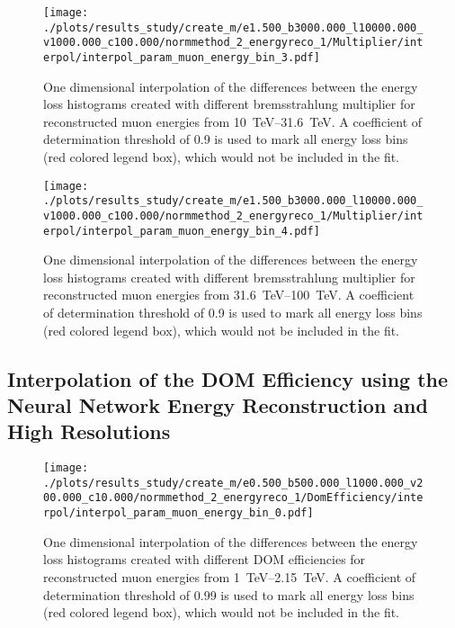 \begin{figure}[H]
    \centering
    \texttt{[image: ./plots/results\_study/create\_m/e1.500\_b3000.000\_l10000.000\_v1000.000\_c100.000/normmethod\_2\_energyreco\_1/Multiplier/interpol/interpol\_param\_muon\_energy\_bin\_3.pdf]}
    \caption{One dimensional interpolation of the differences between the energy loss histograms created with different bremsstrahlung multiplier for reconstructed muon energies from \SIrange{10}{31.6}{TeV}. A coefficient of determination threshold of \num{0.9} is used to mark all energy loss bins (red colored legend box), which would not be included in the fit.}
    \label{fig:study_1d_interpol_mu3_nn_low}
\end{figure}

\begin{figure}[H]
    \centering
    \texttt{[image: ./plots/results\_study/create\_m/e1.500\_b3000.000\_l10000.000\_v1000.000\_c100.000/normmethod\_2\_energyreco\_1/Multiplier/interpol/interpol\_param\_muon\_energy\_bin\_4.pdf]}
    \caption{One dimensional interpolation of the differences between the energy loss histograms created with different bremsstrahlung multiplier for reconstructed muon energies from \SIrange{31.6}{100}{TeV}. A coefficient of determination threshold of \num{0.9} is used to mark all energy loss bins (red colored legend box), which would not be included in the fit.}
    \label{fig:study_1d_interpol_mu4_nn_low}
\end{figure}

%

\subsection*{Interpolation of the DOM Efficiency using the Neural Network Energy Reconstruction and High Resolutions}

\begin{figure}[H]
    \centering
    \texttt{[image: ./plots/results\_study/create\_m/e0.500\_b500.000\_l1000.000\_v200.000\_c10.000/normmethod\_2\_energyreco\_1/DomEfficiency/interpol/interpol\_param\_muon\_energy\_bin\_0.pdf]}
    \caption{One dimensional interpolation of the differences between the energy loss histograms created with different DOM efficiencies for reconstructed muon energies from \SIrange{1}{2.15}{TeV}. A coefficient of determination threshold of \num{0.99} is used to mark all energy loss bins (red colored legend box), which would not be included in the fit.}
    \label{fig:study_1d_interpol_mu0_nn_high_eff}
\end{figure}

